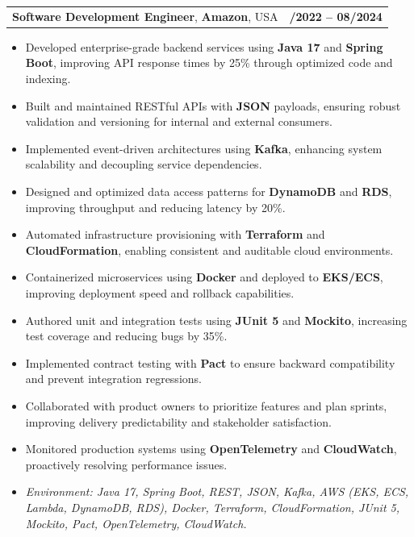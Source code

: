 \documentclass[letterpaper,11pt]{article}
\makeatletter
\newcommand{\resumeItem}[1]{
  \item\footnotesize{
    {#1 \vspace{-2pt}}
  }
}
\newcommand{\resumeSubheading}[4]{
  \vspace{-2pt}\item
    \begin{tabular*}{1.0\textwidth}[t]{l@{\extracolsep{\fill}}r}
      \textbf{\fontsize{10pt}{14pt}\selectfont #3}, \textbf{\fontsize{10pt}{14pt}\selectfont #1}, \fontsize{10pt}{14pt}\selectfont #4 & \textbf{\fontsize{10pt}{14pt}\selectfont #2} \\
    \end{tabular*}\vspace{-7pt}
}
\newcommand{\resumeItemListStart}{\begin{itemize}[leftmargin=*]}
\newcommand{\resumeItemListEnd}{\end{itemize}\vspace{-5pt}}
\makeatother
\begin{document}
\resumeSubheading
{Amazon}{10/2022 -- 08/2024}
{Software Development Engineer}{USA}
\resumeItemListStart
  \resumeItem{Developed enterprise-grade backend services using \textbf{Java 17} and \textbf{Spring Boot}, improving API response times by 25\% through optimized code and indexing.}
  \resumeItem{Built and maintained RESTful APIs with \textbf{JSON} payloads, ensuring robust validation and versioning for internal and external consumers.}
  \resumeItem{Implemented event-driven architectures using \textbf{Kafka}, enhancing system scalability and decoupling service dependencies.}
  \resumeItem{Designed and optimized data access patterns for \textbf{DynamoDB} and \textbf{RDS}, improving throughput and reducing latency by 20\%.}
  \resumeItem{Automated infrastructure provisioning with \textbf{Terraform} and \textbf{CloudFormation}, enabling consistent and auditable cloud environments.}
  \resumeItem{Containerized microservices using \textbf{Docker} and deployed to \textbf{EKS/ECS}, improving deployment speed and rollback capabilities.}
  \resumeItem{Authored unit and integration tests using \textbf{JUnit 5} and \textbf{Mockito}, increasing test coverage and reducing bugs by 35\%.}
  \resumeItem{Implemented contract testing with \textbf{Pact} to ensure backward compatibility and prevent integration regressions.}
  \resumeItem{Collaborated with product owners to prioritize features and plan sprints, improving delivery predictability and stakeholder satisfaction.}
  \resumeItem{Monitored production systems using \textbf{OpenTelemetry} and \textbf{CloudWatch}, proactively resolving performance issues.}
  \resumeItem{\textit{Environment: Java 17, Spring Boot, REST, JSON, Kafka, AWS (EKS, ECS, Lambda, DynamoDB, RDS), Docker, Terraform, CloudFormation, JUnit 5, Mockito, Pact, OpenTelemetry, CloudWatch.}}
\resumeItemListEnd
\end{document}
